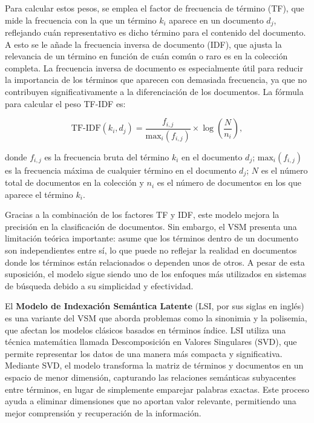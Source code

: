 Para calcular estos pesos, se emplea el factor de frecuencia de término (TF), 
que mide la frecuencia con la que un término \( k_i \) aparece en un documento \( d_j \), 
reflejando cuán representativo es dicho término para el contenido del documento. 
A esto se le añade la frecuencia inversa de documento (IDF), que ajusta la relevancia 
de un término en función de cuán común o raro es en la colección completa. 
La frecuencia inversa de documento es especialmente útil para reducir la importancia 
de los términos que aparecen con demasiada frecuencia, ya que no contribuyen 
significativamente a la diferenciación de los documentos. La fórmula para 
calcular el peso TF-IDF es:

\[
\text{TF-IDF}(k_i, d_j) = \frac{f_{i,j}}{\text{max}_i(f_{i,j})} \times \log \left( \frac{N}{n_i} \right),
\]

donde \( f_{i,j} \) es la frecuencia bruta del término \( k_i \) en el documento \( d_j \); 
\( \text{max}_i(f_{i,j}) \) es la frecuencia máxima de cualquier término en el documento 
\( d_j \); \( N \) es el número total de documentos en la colección y \( n_i \) 
es el número de documentos en los que aparece el término \( k_i \).

Gracias a la combinación de los factores TF y IDF, este modelo mejora la precisión 
en la clasificación de documentos. Sin embargo, el VSM presenta una limitación teórica 
importante: asume que los términos dentro de un documento son independientes entre sí, 
lo que puede no reflejar la realidad en documentos donde los términos están relacionados 
o dependen unos de otros. A pesar de esta suposición, el modelo sigue siendo uno de 
los enfoques más utilizados en sistemas de búsqueda debido a su simplicidad y efectividad.

El \textbf{Modelo de Indexación Semántica Latente} (LSI, por sus siglas en inglés) 
es una variante del VSM que aborda problemas como la sinonimia y la polisemia, 
que afectan los modelos clásicos basados en términos índice. LSI utiliza una 
técnica matemática llamada Descomposición en Valores Singulares (SVD), que permite 
representar los datos de una manera más compacta y significativa. Mediante SVD, 
el modelo transforma la matriz de términos y documentos en un espacio de menor 
dimensión, capturando las relaciones semánticas subyacentes entre términos, 
en lugar de simplemente emparejar palabras exactas. Este proceso ayuda a eliminar 
dimensiones que no aportan valor relevante, permitiendo una mejor comprensión y 
recuperación de la información.

